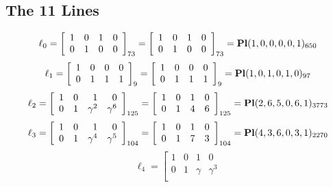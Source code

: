 \documentclass{article}
\begin{document}
{\subsection*{The 11 Lines}
$$
\ell_{0} = 
\left[
\begin{array}{*{4}{r}}
1 & 0 & 1 & 0\\
0 & 1 & 0 & 0\\
\end{array}
\right]
_{73}
=
\left[
\begin{array}{*{4}c}
1  & 0  & 1  & 0\\
0  & 1  & 0  & 0\\
\end{array}
\right]_{73}
={\rm\bf Pl}(1,0,0,0,0,1 )_{650}$$
$$
\ell_{1} = 
\left[
\begin{array}{*{4}{r}}
1 & 0 & 0 & 0\\
0 & 1 & 1 & 1\\
\end{array}
\right]
_{9}
=
\left[
\begin{array}{*{4}c}
1  & 0  & 0  & 0\\
0  & 1  & 1  & 1\\
\end{array}
\right]_{9}
={\rm\bf Pl}(1,0,1,0,1,0 )_{97}$$
$$
\ell_{2} = 
\left[
\begin{array}{*{4}{r}}
1 & 0 & 1 & 0\\
0 & 1 & \gamma^{2} & \gamma^{6}\\
\end{array}
\right]
_{125}
=
\left[
\begin{array}{*{4}c}
1  & 0  & 1  & 0\\
0  & 1  & 4  & 6\\
\end{array}
\right]_{125}
={\rm\bf Pl}(2,6,5,0,6,1 )_{3773}$$
$$
\ell_{3} = 
\left[
\begin{array}{*{4}{r}}
1 & 0 & 1 & 0\\
0 & 1 & \gamma^{4} & \gamma^{5}\\
\end{array}
\right]
_{104}
=
\left[
\begin{array}{*{4}c}
1  & 0  & 1  & 0\\
0  & 1  & 7  & 3\\
\end{array}
\right]_{104}
={\rm\bf Pl}(4,3,6,0,3,1 )_{2270}$$
$$
\ell_{4} = 
\left[
\begin{array}{*{4}{r}}
1 & 0 & 1 & 0\\
0 & 1 & \gamma  & \gamma^{3}\\

\end{array}$$}
\end{document}
